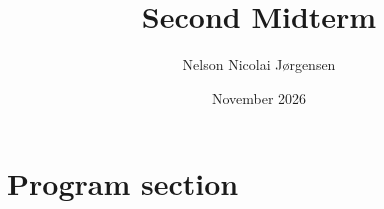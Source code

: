 \documentclass[a4paper, 12pt]{article}
\title{Second Midterm}
\author{Nelson Nicolai Jørgensen}
\date{November 2026}
\begin{document}
\maketitle










\section{Program section}



\end{document}
